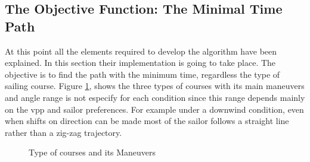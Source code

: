 \subsection{The Objective Function: The Minimal Time Path}
At this point all the elements required to develop the algorithm have been explained. In this section their implementation is going to take place. The objective is to find the path with the minimum time, regardless the type of sailing course. Figure \ref{fig:SailModes_Man}, shows the three types of courses with its main maneuvers and angle range is not especify for each condition since this range depends mainly on the \acrshort{vpp} and sailor preferences. For example under a downwind condition, even when shifts on direction can be made most of the sailor follows a straight line rather than a zig-zag trajectory. \par
\begin{figure} [hbt!]
  \centering
  \hfill 
  \caption{Type of courses and its Maneuvers \cite{Alves2014ASailboat}}
\label{fig:SailModes_Man} 
\end{figure}

